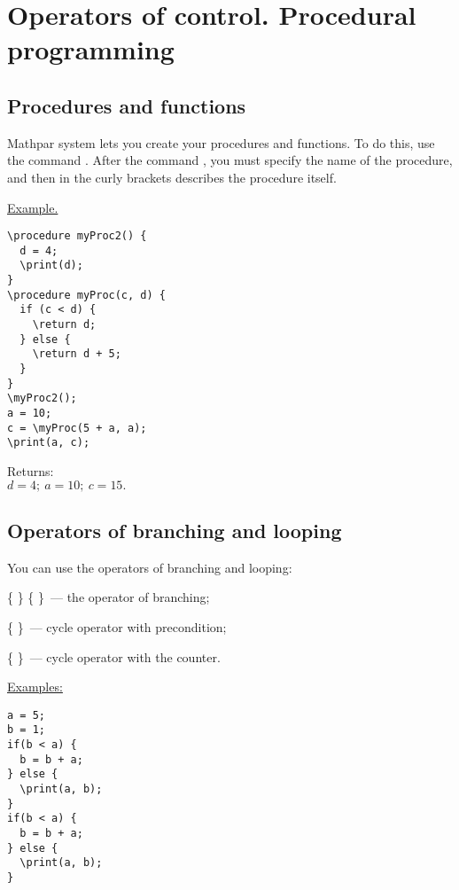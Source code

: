 \chapter{Operators of control. Procedural programming}

\section{Procedures and functions} 

Mathpar system lets you create your procedures and functions. 
To do this, use the command . After the command , you must specify the name of the procedure, 
and then in the curly brackets describes the procedure itself.
\smallskip

\underline{Example.}

\vspace*{-3mm}
 
\begin{verbatim}
\procedure myProc2() {
  d = 4;
  \print(d);
}
\procedure myProc(c, d) {
  if (c < d) {
    \return d;
  } else {
    \return d + 5;
  }
}
\myProc2();
a = 10;
c = \myProc(5 + a, a);
\print(a, c);
\end{verbatim}

Returns: \\
$d = 4;\  
a = 10;\  
c = 15.$ 

\section{Operators of branching and looping}

You can use the operators of branching and looping:

 \{ \}  \{ \}~--- the operator of branching; 

\comm{while }{()} \{ \}~--- cycle operator with precondition; 

 \{ \}~--- cycle operator with the counter.  

\smallskip

\underline{Examples:}

\vspace*{-3mm}

\begin{verbatim}
a = 5;
b = 1;
if(b < a) {
  b = b + a;
} else {
  \print(a, b);
}
if(b < a) {
  b = b + a;
} else {
  \print(a, b);
}
\end{verbatim}

